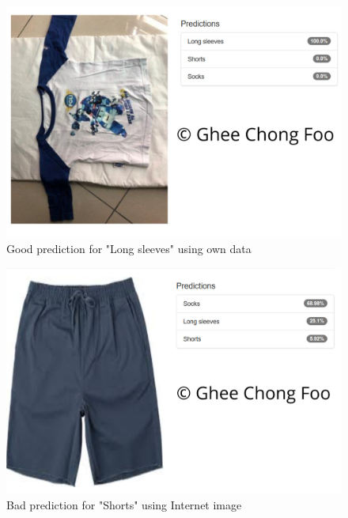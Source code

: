 \documentclass[10pt,journal,compsoc]{IEEEtran}
\begin{document}
\begin{figure}[thpb]
      \centering
      \includegraphics[width=\linewidth]{long_good_predict1}
      \caption{Good prediction for "Long sleeves" using own data}
      \label{fig:long_good_predict1}
\end{figure}

\begin{figure}[thpb]
      \centering
      \includegraphics[width=\linewidth]{short_bad_predict1}
      \caption{Bad prediction for "Shorts" using Internet image}
      \label{fig:short_bad_predict1}
\end{figure}
\end{document}
